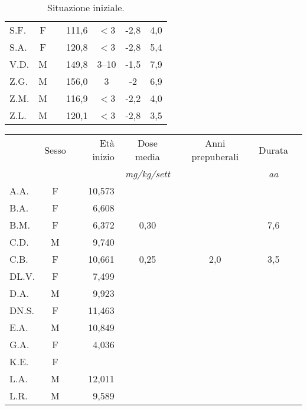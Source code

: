 \begin{table}[!h]
\begin{center}
\begin{tabular}{lcccccc}
S.F.	& F &  				  		& 111,6 & $<$3  & -2,8 & 4,0 \\
S.A.	& F &  				  		& 120,8 & $<$3  & -2,8 & 5,4 \\
V.D.	& M &  				  		& 149,8 & 3--10 & -1,5 & 7,9 \\
Z.G.	& M &  				  		& 156,0 & 3     & -2   & 6,9  \\
Z.M.	& M &  				  		& 116,9 & $<$3  & -2,2 & 4,0 \\
Z.L.	& M &  				  		& 120,1 & $<$3  & -2,8 & 3,5 \\
\bottomrule
\end{tabular}
\end{center}
\caption{Situazione iniziale.}
\label{tab:SituazioneIniziale}
\end{table}


\begin{table}[!h]
\begin{center}
\begin{tabular}{lcrcccl}
\toprule
 &      Sesso &   Età inizio  & Dose media 	& Anni prepuberali & Durata \\
 &     &				  & \emph{mg/kg/sett}	& & \emph{aa} \\
\midrule
A.A.	& F & 10,573  	      &  		    &              &     \\
B.A.	& F & 6,608   	      &             &                &     \\
B.M.	& F & 6,372   	      & 0,30        &              & 7,6 \\
C.D.	& M & 9,740   	      &             &                &     \\
C.B.	& F & 10,661  	      & 0,25        & 2,0                & 3,5 \\
DL.V.	& F & 7,499   	      &             &                  &     \\
D.A.	& M & 9,923   	      &             &                  &     \\
DN.S.	& F & 11,463  	      &             &                  &     \\
E.A.	& M & 10,849  	      &             &                  &     \\
G.A.	& F & 4,036   	      &             &                  &     \\
K.E.	& F &         	      &             &                  &     \\
L.A.	& M & 12,011  	      &             &                  &     \\
L.R.	& M & 9,589   	      &             &                  &     \\

\end{tabular}
\end{center}
\end{table}
